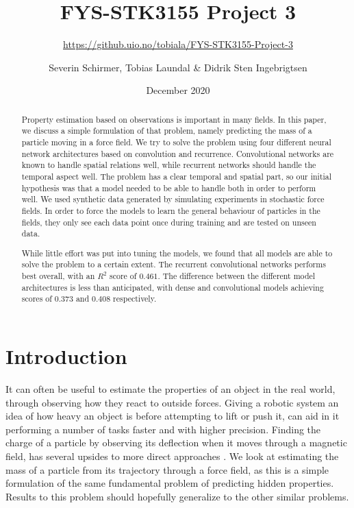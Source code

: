 \documentclass[a4paper]{article}
\title{\textbf{FYS-STK3155 Project 3}}
\subtitle{\url{https://github.uio.no/tobiala/FYS-STK3155-Project-3}}
\author{Severin Schirmer, Tobias Laundal \& Didrik Sten Ingebrigtsen}
\date{December 2020}
\begin{document}
\maketitle

\begin{abstract}
Property estimation based on observations is important in many fields. In this paper, we discuss a simple formulation of that problem, namely predicting the mass of a particle moving in a force field. We try to solve the problem using four different neural network architectures based on convolution and recurrence. Convolutional networks are known to handle spatial relations well, while recurrent networks should handle the temporal aspect well. The problem has a clear temporal and spatial part, so our initial hypothesis was that a model needed to be able to handle both in order to perform well. We used synthetic data generated by simulating experiments in stochastic force fields. In order to force the models to learn the general behaviour of particles in the fields, they only see each data point once during training and are tested on unseen data.

While little effort was put into tuning the models, we found that all models are able to solve the problem to a certain extent. The recurrent convolutional networks performs best overall, with an $R^2$ score of $0.461$. The difference between the different model architectures is less than anticipated, with dense and convolutional models achieving scores of $0.373$ and $0.408$ respectively. 
\end{abstract}

\section{Introduction}
It can often be useful to estimate the properties of an object in the real world, through observing how they react to outside forces. Giving a robotic system an idea of how heavy an object is before attempting to lift or push it, can aid in it performing a number of tasks faster and with higher precision. Finding the charge of a particle by observing its deflection when it moves through a magnetic field, has several upsides to more direct approaches \cite{dust_particle}. We look at estimating the mass of a particle from its trajectory through a force field, as this is a simple formulation of the same fundamental problem of predicting hidden properties. Results to this problem should hopefully generalize to the other similar problems.
\end{document}
